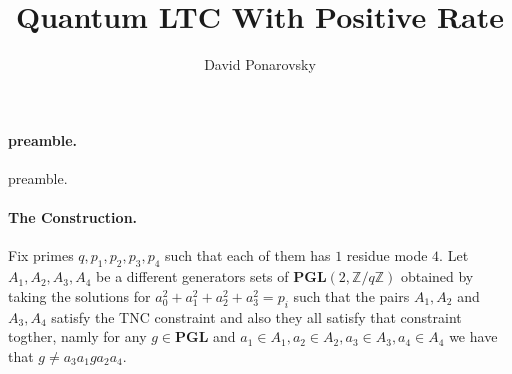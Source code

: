 \documentclass{article}
\begin{document}
\title{Quantum LTC With Positive Rate}
\author{David Ponarovsky}
\maketitle
\begin{multicols*}{2}
\newcommand{ \Hw }{ \delta\Delta -\Delta^{\frac{1}{2}-\varepsilon}/\delta  }
	\newcommand{ \Nw }{ \Delta^{\frac{3}{2}-\varepsilon}} 
	  \newcommand{ \Gu } { \Gamma^{\cup} }
	  \newcommand{ \Guq } { \Gamma^{\cup, \square} }

    	\newcommand{ \Gsa } {\Gamma_{\square_{1}} }
	\newcommand{ \Gsah } { \Gamma_{\square_{1}}^{h}} 
	\newcommand{ \Gsb } {\Gamma_{\square_{2}} }
	\newcommand{ \Gsbh } {\Gamma_{\square_{2}}^{h} }
        \newcommand{ \Aa } { C_{A_{1}}}  
	\newcommand{ \Ab } { C_{A_{2}}}
	\newcommand{ \Ac } { C_{A_{3}}}
	\newcommand{ \Ad } { C_{A_{4}}}
	\newcommand{ \Aab } { \Aa \otimes \Ab } 
	\newcommand{ \Acd } { \Ac \otimes \Ad } 
	\newcommand{ \Aac } { \Aa \otimes \Ac }
	\newcommand{ \Aabc } { \Aa \otimes \Ab \otimes \Ac }
	\newcommand{ \Aabp } { \Aa^{\perp} \otimes \Ab^{\perp} } 
	\newcommand{ \Aacp } { \Aa^{\perp} \otimes \Ac^{\perp} }
	\newcommand{ \Aabcp } { \Aa^{\perp} \otimes \Ab^{\perp} \otimes \Ac^{\perp} }
	\newcommand{ \Aabpp } { \left( \Aabp \right)^\perp } 
	\newcommand{ \Aacpp } { \left( \Aacp \right)^\perp }
	\newcommand{ \Aabcpp } { \left( \Aabcp \right)^\perp }
	\newcommand{ \YY } {  y_{1}y_{2}^{\top} }
	\newcommand{ \ZZ } {  z_{1}z_{2}^{\top} } 
	\newcommand{ \TT } { \tilde{\tau} } 


  \paragraph{preamble.} preamble.  
  \paragraph{The Construction.} Fix primes $q,p_1,p_2,p_3,p_4$ such that each of them has $1 $ residue mode $4$. Let $A_{1},A_{2},A_{3},A_{4}$ be a different generators sets of $ \mathbf{PGL}(2 , \mathbb{Z} / q\mathbb{Z} )  $ 
  obtained by taking the solutions for $a_{0}^{2} + a_{1}^{2} +a_{2}^{2} +a_{3}^{2} = p_i $ such that the pairs $A_{1},A_{2}$ and $A_{3},A_{4}$ satisfy the 
  TNC constraint and also they all satisfy that constraint togther, namly for any $g \in \mathbf{PGL}$  and $a_{1}\in A_{1}, a_{2} \in A_{2}, a_{3} \in A_{3}, a_{4} \in A_{4}$ we have that $ g \neq a_{3}a_{1}ga_{2}a_{4}$. 
  

\end{multicols*}
\end{document}
